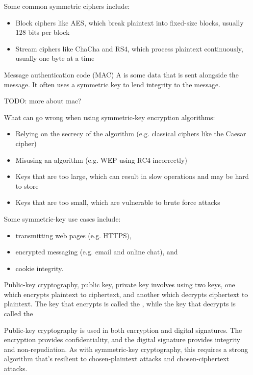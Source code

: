 Some common symmetric ciphers include:

\begin{itemize}
    \item Block ciphers like AES, which break plaintext into fixed-size blocks, usually 128 bits per block
    \item Stream ciphers like ChaCha and RS4, which process plaintext continuously, usually one byte at a time
\end{itemize}

\begin{dfnbox}{Message authentication code (MAC)}{}
    A  is some data that is sent alongside the message. It often uses a symmetric key to lend integrity to the message.
\end{dfnbox}

TODO: more about mac?

What can go wrong when using symmetric-key encryption algorithms:
\begin{itemize}
    \item Relying on the secrecy of the algorithm (e.g. classical ciphers like the Caesar cipher)
    \item Misusing an algorithm (e.g. WEP using RC4 incorrectly)
    \item Keys that are too large, which can result in slow operations and may be hard to store
    \item Keys that are too small, which are vulnerable to brute force attacks
\end{itemize}

Some symmetric-key use cases include:
\begin{itemize}
    \item transmitting web pages (e.g. HTTPS),
    \item encrypted messaging (e.g. email and online chat), and
    \item cookie integrity.
\end{itemize}

\begin{dfnbox}{Public-key cryptography, public key, private key}{}
     involves using two keys, one which encrypts plaintext to ciphertext, and another which decrypts ciphertext to plaintext. The key that encrypts is called the , while the key that decrypts is called the 
\end{dfnbox}

Public-key cryptography is used in both encryption and digital signatures. The encryption provides confidentiality, and the digital signature provides integrity and non-repudiation. As with symmetric-key cryptography, this requires a strong algorithm that's resilient to chosen-plaintext attacks and chosen-ciphertext attacks.

